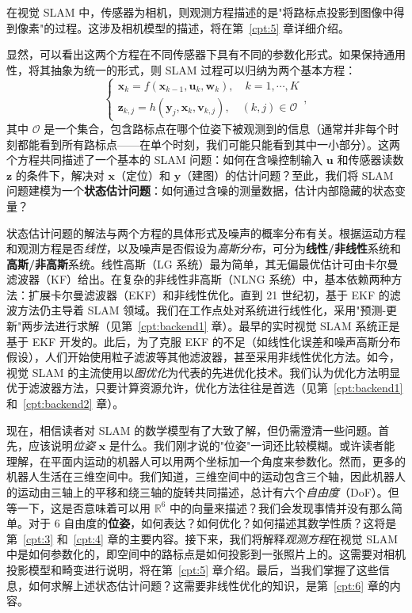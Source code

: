 在视觉 SLAM 中，传感器为相机，则观测方程描述的是"将路标点投影到图像中得到像素"的过程。这涉及相机模型的描述，将在第~\ref{cpt:5} 章详细介绍。

显然，可以看出这两个方程在不同传感器下具有不同的参数化形式。如果保持通用性，将其抽象为统一的形式，则 SLAM 过程可以归纳为两个基本方程：
\begin{equation}
\label{eq:slamproblem}
\left\{ \begin{array}{l}
{\mathbf{x}_k} = f\left( {{\mathbf{x}_{k - 1}},{\mathbf{u}_k}}, \mathbf{w}_k \right),\quad k=1,\cdots, K\\
{\mathbf{z}_{k,j}} = h\left( {{ \mathbf{y}_j},{ \mathbf{x}_k}}, \mathbf{v}_{k,j} \right), \quad (k,j) \in \mathcal{O}
\end{array} \right. ,
\end{equation}
其中 $\mathcal{O}$ 是一个集合，包含路标点在哪个位姿下被观测到的信息（通常并非每个时刻都能看到所有路标点——在单个时刻，我们可能只能看到其中一小部分）。这两个方程共同描述了一个基本的 SLAM 问题：如何在含噪控制输入 $\mathbf{u}$ 和传感器读数 $\mathbf{z}$ 的条件下，解决对 $\mathbf{x}$（定位）和 $\mathbf{y}$（建图）的估计问题？至此，我们将 SLAM 问题建模为一个\textbf{状态估计问题}：如何通过含噪的测量数据，估计内部隐藏的状态变量？

状态估计问题的解法与两个方程的具体形式及噪声的概率分布有关。根据运动方程和观测方程是否\textit{线性}，以及噪声是否假设为\textit{高斯分布}，可分为\textbf{线性/非线性}系统和\textbf{高斯/非高斯}系统。线性高斯（LG 系统）最为简单，其无偏最优估计可由卡尔曼滤波器（KF）给出。在复杂的非线性非高斯（NLNG 系统）中，基本依赖两种方法：扩展卡尔曼滤波器（EKF）和非线性优化。直到 21 世纪初，基于 EKF 的滤波方法仍主导着 SLAM 领域。我们在工作点处对系统进行线性化，采用"预测-更新"两步法进行求解（见第~\ref{cpt:backend1} 章）。最早的实时视觉 SLAM 系统正是基于 EKF 开发的{\cite{Davison2007}}。此后，为了克服 EKF 的不足（如线性化误差和噪声高斯分布假设），人们开始使用粒子滤波等其他滤波器，甚至采用非线性优化方法。如今，视觉 SLAM 的主流使用以\textit{图优化}为代表的先进优化技术{\cite{Strasdat2012}}。我们认为优化方法明显优于滤波器方法，只要计算资源允许，优化方法往往是首选（见第~\ref{cpt:backend1} 和~\ref{cpt:backend2} 章）。

现在，相信读者对 SLAM 的数学模型有了大致了解，但仍需澄清一些问题。首先，应该说明\textit{位姿} $\mathbf{x}$ 是什么。我们刚才说的"位姿"一词还比较模糊。或许读者能理解，在平面内运动的机器人可以用两个坐标加一个角度来参数化。然而，更多的机器人生活在三维空间中。我们知道，三维空间中的运动包含三个轴，因此机器人的运动由三轴上的平移和绕三轴的旋转共同描述，总计有六个\textit{自由度}（DoF）。但等一下，这是否意味着可以用 $\mathbb{R}^6$ 中的向量来描述？我们会发现事情并没有那么简单。对于 6 自由度的\textbf{位姿}，如何表达？如何优化？如何描述其数学性质？这将是第~\ref{cpt:3} 和~\ref{cpt:4} 章的主要内容。接下来，我们将解释\textit{观测方程}在视觉 SLAM 中是如何参数化的，即空间中的路标点是如何投影到一张照片上的。这需要对相机投影模型和畸变进行说明，将在第~\ref{cpt:5} 章介绍。最后，当我们掌握了这些信息，如何求解上述状态估计问题？这需要非线性优化的知识，是第~\ref{cpt:6} 章的内容。
    
